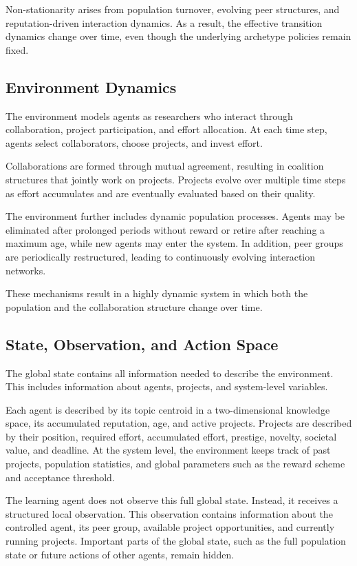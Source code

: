 \documentclass[english,bachelor]{hsluthesis}
\begin{document}
Non-stationarity arises from population turnover, evolving peer structures, and reputation-driven interaction dynamics. As a result, the effective transition dynamics change over time, even though the underlying archetype policies remain fixed.

\subsection{Environment Dynamics}
The environment models agents as researchers who interact through collaboration, project participation, and effort allocation. At each time step, agents select collaborators, choose projects, and invest effort.

Collaborations are formed through mutual agreement, resulting in coalition structures that jointly work on projects. Projects evolve over multiple time steps as effort accumulates and are eventually evaluated based on their quality.

The environment further includes dynamic population processes. Agents may be eliminated after prolonged periods without reward or retire after reaching a maximum age, while new agents may enter the system. In addition, peer groups are periodically restructured, leading to continuously evolving interaction networks.

These mechanisms result in a highly dynamic system in which both the population and the collaboration structure change over time.

\subsection{State, Observation, and Action Space}

The global state contains all information needed to describe the environment. This includes information about agents, projects, and system-level variables.

Each agent is described by its topic centroid in a two-dimensional knowledge space, its accumulated reputation, age, and active projects. Projects are described by their position, required effort, accumulated effort, prestige, novelty, societal value, and deadline. At the system level, the environment keeps track of past projects, population statistics, and global parameters such as the reward scheme and acceptance threshold.

The learning agent does not observe this full global state. Instead, it receives a structured local observation. This observation contains information about the controlled agent, its peer group, available project opportunities, and currently running projects. Important parts of the global state, such as the full population state or future actions of other agents, remain hidden.
\end{document}
